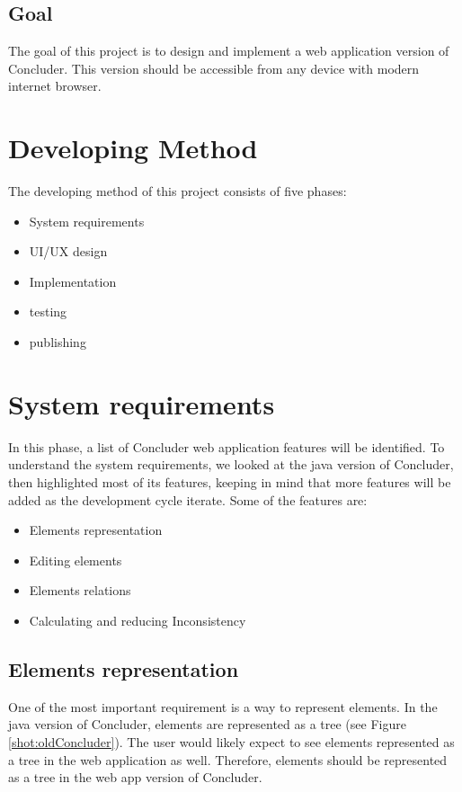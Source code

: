 \documentclass[11pt]{article} %
\begin{document}
\subsection{Goal}
The goal of this project is to design and implement a web application version of Concluder. This version should be accessible from any device with modern internet browser.

\section{Developing Method}

The developing method of this project consists of five phases:
\begin{itemize}
\item System requirements
\item UI/UX design
\item Implementation
\item testing
\item publishing
\end{itemize}

\section{System requirements}
In this phase, a list of Concluder web application features will be identified. To understand the system requirements, we looked at the java version of Concluder, then highlighted most of its features, keeping in mind that more features will be added as the development cycle iterate.
Some of the features are:
\begin{itemize}
\item Elements representation
\item Editing elements
\item Elements relations
\item Calculating and reducing Inconsistency
\end{itemize}


\subsection{Elements representation}
One of the most important requirement is a way to represent elements. In the java version of Concluder, elements are represented as a tree (see Figure \ref{shot:oldConcluder}).  The user would likely expect to see elements represented as a tree in the web application as well. Therefore, elements should be represented as a tree in the web app version of Concluder.
\end{document}
